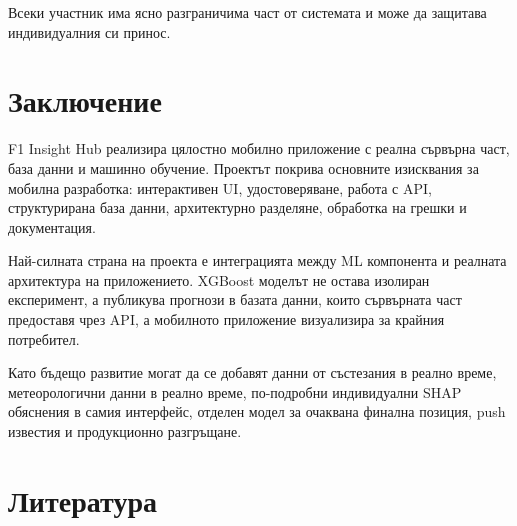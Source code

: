 \documentclass[12pt,a4paper]{article}
\begin{document}
Всеки участник има ясно разграничима част от системата и може да защитава индивидуалния си принос. 

\section{Заключение}

F1 Insight Hub реализира цялостно мобилно приложение с реална сървърна част, база данни и машинно обучение. Проектът покрива основните изисквания за мобилна разработка: интерактивен UI, удостоверяване, работа с API, структурирана база данни, архитектурно разделяне, обработка на грешки и документация.

Най-силната страна на проекта е интеграцията между ML компонента и реалната архитектура на приложението. XGBoost моделът не остава изолиран експеримент, а публикува прогнози в базата данни, които сървърната част предоставя чрез API, а мобилното приложение визуализира за крайния потребител.

Като бъдещо развитие могат да се добавят данни от състезания в реално време, метеорологични данни в реално време, по-подробни индивидуални SHAP обяснения в самия интерфейс, отделен модел за очаквана финална позиция, push известия и продукционно разгръщане.

\clearpage
\section{Литература}
\end{document}
